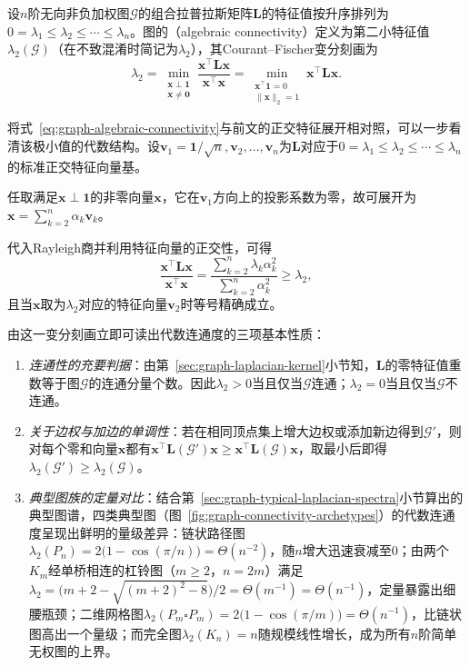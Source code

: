 \begin{definition}[代数连通度]
\label{def:graph-algebraic-connectivity}
设$n$阶无向非负加权图$\mathcal G$的组合拉普拉斯矩阵$\bm L$的特征值按升序排列为$0=\lambda_1\leq\lambda_2\leq\cdots\leq\lambda_n$。图的（algebraic connectivity）定义为第二小特征值$\lambda_2(\mathcal G)$（在不致混淆时简记为$\lambda_2$），其Courant--Fischer变分刻画为
\begin{equation}
\label{eq:graph-algebraic-connectivity}
\lambda_2
=\min_{\substack{\bm x\perp\bm 1\\\bm x\ne\bm 0}}
\frac{\bm x^\top\bm L\bm x}{\bm x^\top\bm x}
=\min_{\substack{\bm x^\top\bm 1=0\\\lVert\bm x\rVert_2=1}}
\bm x^\top\bm L\bm x.
\end{equation}
\end{definition}

将式~\eqref{eq:graph-algebraic-connectivity}与前文的正交特征展开相对照，可以一步看清该极小值的代数结构。设$\bm v_1=\bm 1/\sqrt{n},\bm v_2,\ldots,\bm v_n$为$\bm L$对应于$0=\lambda_1\leq\lambda_2\leq\cdots\leq\lambda_n$的标准正交特征向量基。

任取满足$\bm x\perp\bm 1$的非零向量$\bm x$，它在$\bm v_1$方向上的投影系数为零，故可展开为$\bm x=\sum_{k=2}^n\alpha_k\bm v_k$。

代入Rayleigh商并利用特征向量的正交性，可得
\[
  \frac{\bm x^\top\bm L\bm x}{\bm x^\top\bm x}
  = \frac{\sum_{k=2}^n\lambda_k\alpha_k^2}{\sum_{k=2}^n\alpha_k^2}
  \geq \lambda_2,
\]
且当$\bm x$取为$\lambda_2$对应的特征向量$\bm v_2$时等号精确成立。

由这一变分刻画立即可读出代数连通度的三项基本性质：
\begin{enumerate}
\item \emph{连通性的充要判据}：由第~\ref{sec:graph-laplacian-kernel}小节知，$\bm L$的零特征值重数等于图$\mathcal G$的连通分量个数。因此$\lambda_2>0$当且仅当$\mathcal G$连通；$\lambda_2=0$当且仅当$\mathcal G$不连通。
\item \emph{关于边权与加边的单调性}：若在相同顶点集上增大边权或添加新边得到$\mathcal G'$，则对每个零和向量$\bm x$都有$\bm x^\top\bm L(\mathcal G')\bm x\geq\bm x^\top\bm L(\mathcal G)\bm x$，取最小后即得$\lambda_2(\mathcal G')\geq\lambda_2(\mathcal G)$。
\item \emph{典型图族的定量对比}：结合第~\ref{sec:graph-typical-laplacian-spectra}小节算出的典型图谱，四类典型图（图~\ref{fig:graph-connectivity-archetypes}）的代数连通度呈现出鲜明的量级差异：链状路径图$\lambda_2(P_n)=2\bigl(1-\cos(\pi/n)\bigr)=\Theta(n^{-2})$，随$n$增大迅速衰减至$0$；由两个$K_m$经单桥相连的杠铃图（$m\geq2$，$n=2m$）满足$\lambda_2=\bigl(m+2-\sqrt{(m+2)^2-8}\bigr)/2=\Theta(m^{-1})=\Theta(n^{-1})$，定量暴露出细腰瓶颈；二维网格图$\lambda_2(P_m\square P_m)=2\bigl(1-\cos(\pi/m)\bigr)=\Theta(n^{-1})$，比链状图高出一个量级；而完全图$\lambda_2(K_n)=n$随规模线性增长，成为所有$n$阶简单无权图的上界。
\end{enumerate}

